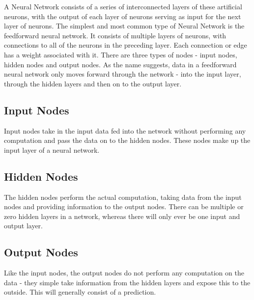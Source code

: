 \documentclass[12pt]{report}
\begin{document}
\begin{flushleft}
A Neural Network consists of a series of interconnected layers of these artificial neurons, with the output of each layer of neurons serving as input for the next layer of neurons. The simplest and most common type of Neural Network is the feedforward neural network. It consists of multiple layers of neurons, with connections to all of the neurons in the preceding layer. Each connection or edge has a weight associated with it. There are three types of nodes - input nodes, hidden nodes and output nodes. As the name suggests, data in a feedforward neural network only moves forward through the network - into the input layer, through the hidden layers and then on to the output layer.
\end{flushleft}

\subsection{Input Nodes}
\begin{flushleft}
Input nodes take in the input data fed into the network without performing any computation and pass the data on to the hidden nodes. These nodes make up the input layer of a neural network.
\end{flushleft}

\subsection{Hidden Nodes}
\begin{flushleft}
The hidden nodes perform the actual computation, taking data from the input nodes and providing information to the output nodes. There can be multiple or zero hidden layers in a network, whereas there will only ever be one input and output layer.
\end{flushleft}

\subsection{Output Nodes}
\begin{flushleft}
Like the input nodes, the output nodes do not perform any computation on the data - they simple take information from the hidden layers and expose this to the outside. This will generally consist of a prediction.
\end{flushleft}
\end{document}
